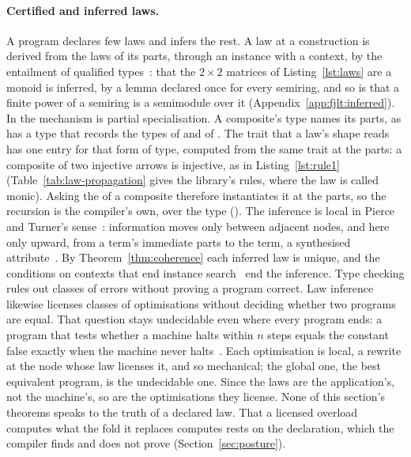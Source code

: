 \paragraph{Certified and inferred laws.}
A program declares few laws and infers the rest.
A law at a construction is derived from the laws of its parts, through an instance with a context, by the entailment of qualified types~\cite{jones1994qualified}: that the $2 \times 2$ matrices of Listing~\ref{lst:laws} are a monoid is inferred, by a lemma declared once for every semiring, and so is that a finite power of a semiring is a semimodule over it (Appendix~\ref{app:fjlt:inferred}).
In \Cpp{} the mechanism is partial specialisation.
A composite's type names its parts, as  has a type that records the types of  and of .
The trait that a law's shape reads has one entry for that form of type, computed from the same trait at the parts: a composite of two injective arrows is injective, as in Listing~\ref{lst:rule1} (Table~\ref{tab:law-propagation} gives the library's rules, where the law is called monic).
Asking the  of a composite therefore instantiates it at the parts, so the recursion is the compiler's own, over the type (\RuleThree{}).
The inference is local in Pierce and Turner's sense~\cite{pierce2000local}: information moves only between adjacent nodes, and here only upward, from a term's immediate parts to the term, a synthesised attribute~\cite{knuth1968semantics}.
By Theorem~\ref{thm:coherence} each inferred law is unique, and the conditions on contexts that end instance search~\cite{sulzmann2007understanding} end the inference.
Type checking rules out classes of errors without proving a program correct.
Law inference likewise licenses classes of optimisations without deciding whether two programs are equal.
That question stays undecidable even where every program ends: a program that tests whether a machine halts within $n$ steps equals the constant false exactly when the machine never halts~\cite{turing1936computable}.
Each optimisation is local, a rewrite at the node whose law licenses it, and so mechanical; the global one, the best equivalent program, is the undecidable one.
Since the laws are the application's, not the machine's, so are the optimisations they license.
None of this section's theorems speaks to the truth of a declared law.
That a licensed overload computes what the fold it replaces computes rests on the declaration, which the compiler finds and does not prove (Section~\ref{sec:posture}).

